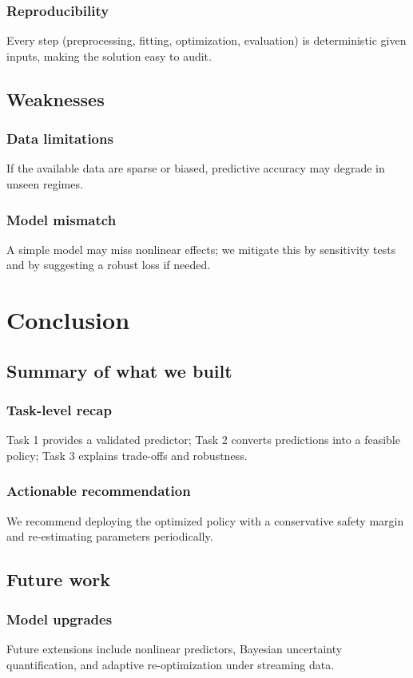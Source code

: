 \documentclass[12pt]{article}
\begin{document}
\subsubsection{Reproducibility}
Every step (preprocessing, fitting, optimization, evaluation) is deterministic given inputs, making the solution easy to audit.

\subsection{Weaknesses}
\subsubsection{Data limitations}
If the available data are sparse or biased, predictive accuracy may degrade in unseen regimes.

\subsubsection{Model mismatch}
A simple model may miss nonlinear effects; we mitigate this by sensitivity tests and by suggesting a robust loss if needed.

\section{Conclusion}
\subsection{Summary of what we built}
\subsubsection{Task-level recap}
Task 1 provides a validated predictor; Task 2 converts predictions into a feasible policy; Task 3 explains trade-offs and robustness.

\subsubsection{Actionable recommendation}
We recommend deploying the optimized policy with a conservative safety margin and re-estimating parameters periodically.

\subsection{Future work}
\subsubsection{Model upgrades}
Future extensions include nonlinear predictors, Bayesian uncertainty quantification, and adaptive re-optimization under streaming data.
\end{document}
